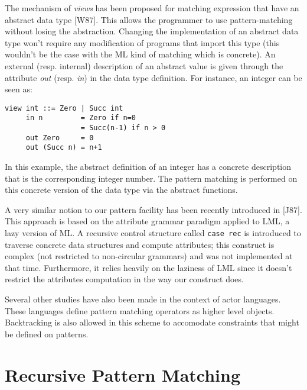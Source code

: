\documentclass[a4paper,11pt]{article}
\begin{document}
The mechanism of \emph{views} has been proposed for matching expression
that have an abstract data type [W87]. This allows the programmer to
use pattern-matching without losing the abstraction. Changing the
implementation of an abstract data type won't require any modification
of programs that import this type (this wouldn't be the case with the
ML kind of matching which is concrete).  An external (resp.  internal)
description of an abstract value is given through the attribute {\em
out} (resp. \emph{in}) in the data type definition.  For instance, an
integer can be seen as:
\begin{verbatim}
view int ::= Zero | Succ int
     in n         = Zero if n=0
                  = Succ(n-1) if n > 0
     out Zero     = 0
     out (Succ n) = n+1
\end{verbatim}
In this example, the abstract definition of an integer has a
concrete description that is the corresponding integer number. The
pattern matching is performed on this concrete version of the data
type via the abstract functions.

A very similar notion to our pattern facility has been recently
introduced in [J87]. This approach is based on the attribute grammar
paradigm applied to LML, a lazy version of ML. A recursive control
structure called \texttt{case rec} is introduced to traverse concrete
data structures and compute attributes; this construct is complex (not
restricted to non-circular grammars) and was not implemented at that
time. Furthermore, it relies heavily on the laziness of LML since it
doesn't restrict the attributes computation in the way our construct
does.

Several other studies have also been made in the context of actor
languages. These languages define pattern matching operators as higher
level objects. Backtracking is also allowed in this scheme to accomodate
constraints that might be defined on patterns. 

\section{Recursive Pattern Matching}
\end{document}
